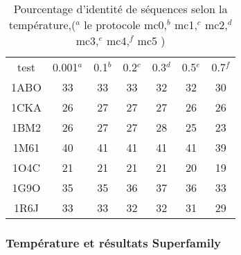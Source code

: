     \begin{table}[!htbp]
      \centering

      \begin{tabular}{ccccccc}
      
        \toprule
         test & 0.001$^a$ & 0.1$^b$ & 0.2$^c$  & 0.3$^d$ & 0.5$^e$ & 0.7$^f$  \\
        \cmidrule{1-7}
        1ABO & 33 & 33 & 33 & 32 & 32  & 30 \\      
        1CKA & 26 & 27 & 27 & 27 & 26  & 26 \\  
        1BM2 & 26 & 27 & 27 & 28 & 25  & 23 \\  
        1M61 & 40 & 41 & 41 & 41 & 41  & 39 \\  
        1O4C & 21 & 21 & 21 & 21 & 20  & 19 \\  
        1G9O & 35 & 35 & 36 & 37 & 36  & 33 \\  
        1R6J & 33 & 33 & 32 & 32 & 31  & 29 \\  
        \bottomrule
        
      \end{tabular}
      

      \caption{Pourcentage d'identité de séquences selon la température,($^a$ le protocole mc0,$^b$ mc1,$^c$  mc2,$^d$ mc3,$^e$ mc4,$^f$ mc5 )}      
      \label{tab:ident_mc}
    \end{table}



   \subsubsection{Température et résultats Superfamily} 

